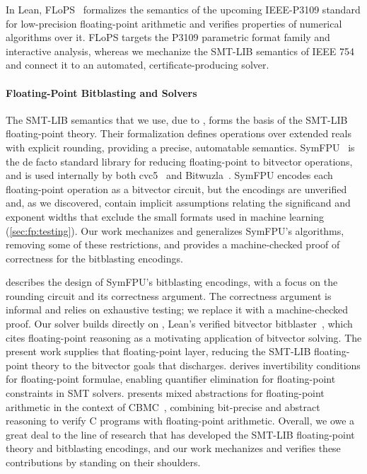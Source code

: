 In Lean, FLoPS~\cite{flops} formalizes the semantics of the upcoming
IEEE-P3109 standard for low-precision floating-point arithmetic and verifies
properties of numerical algorithms over it.
FLoPS targets the P3109 parametric format family and interactive analysis,
whereas we mechanize the SMT-LIB semantics of IEEE 754 and connect it to an
automated, certificate-producing solver.

\paragraph*{Floating-Point Bitblasting and Solvers}
The SMT-LIB semantics that we use, due to \citet{extrealsemantics}, forms the basis of the SMT-LIB floating-point theory.
Their formalization defines operations over extended reals with explicit rounding,
providing a precise, automatable semantics.
SymFPU~\cite{symfpu} is the de facto standard library for reducing floating-point
to bitvector operations, and is used internally by both cvc5~\cite{barbosa2022cvc5} and
Bitwuzla~\cite{niemetz2023bitwuzla}. SymFPU encodes each floating-point operation as a
bitvector circuit, but the encodings are unverified and, as we discovered,
contain implicit assumptions relating the significand and exponent widths
that exclude the small formats used in machine learning (\cref{sec:fp:testing}).
Our work mechanizes and generalizes SymFPU's algorithms, removing some of these restrictions,
and provides a machine-checked proof of correctness for the bitblasting encodings.

\citet{symfpu} describes the design of SymFPU's bitblasting encodings,
with a focus on the rounding circuit and its correctness argument.
The correctness argument is informal and relies on exhaustive testing;
we replace it with a machine-checked proof.
Our solver builds directly on \bvdecide{}, Lean's verified bitvector
bitblaster~\cite{leanbv}, which cites floating-point reasoning as a motivating
application of bitvector solving. The present work supplies that
floating-point layer, reducing the SMT-LIB floating-point theory to the
bitvector goals that \bvdecide{} discharges.
\citet{brain2019invertibility} derives invertibility conditions for floating-point formulae,
enabling quantifier elimination for floating-point constraints in SMT solvers.
\citet{cbmcfloat} presents mixed abstractions for floating-point arithmetic in the context
of CBMC~\cite{cbmc}, combining bit-precise and abstract reasoning to verify C programs with floating-point arithmetic.
Overall, we owe a great deal to the line of research that has developed the SMT-LIB floating-point theory and bitblasting encodings,
and our work mechanizes and verifies these contributions by standing on their shoulders.

